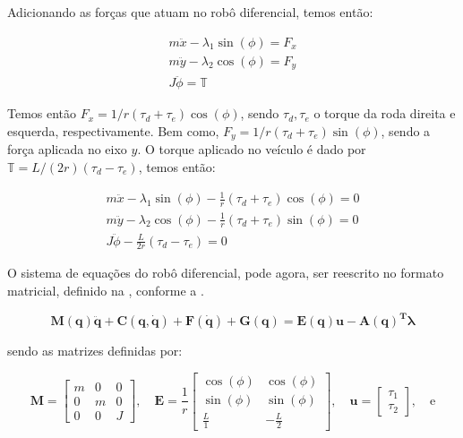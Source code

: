 Adicionando as forças que atuam no robô diferencial, temos então:

\begin{equation}
    \begin{split}
        m\ddot{x} - \lambda_1 \sin(\phi) = F_x \\
        m\ddot{y} - \lambda_2 \cos(\phi) = F_y \\
        J\ddot{\phi} = \mathbb{T}
    \end{split}
\end{equation}

Temos então $F_x = 1/r\left( \tau_{d}+ \tau_{e}\right)\cos(\phi)$, sendo $\tau_d, \tau_e$ o torque da roda direita e esquerda, respectivamente.
Bem como, $F_y = 1/r\left( \tau_{d}+ \tau_{e}\right)\sin(\phi)$, sendo a força aplicada no eixo $y$. O torque aplicado no veículo é dado por $\mathbb{T}= L/(2r)\left( \tau_d - \tau_e \right)$,
temos então:

\begin{equation}
    \begin{split}
        m\ddot{x} - \lambda_1 \sin(\phi) - \frac{1}{r}\left( \tau_d + \tau_e \right) \cos(\phi)= 0 \\
        m\ddot{y} - \lambda_2 \cos(\phi) - \frac{1}{r}\left( \tau_d + \tau_e \right) \sin(\phi)= 0 \\
        J\ddot{\phi} - \frac{L}{2r}\left( \tau_d - \tau_e \right)= 0
    \end{split}
\end{equation}

O sistema de equações do robô diferencial, pode agora, ser reescrito no formato matricial, definido na , conforme a .

\begin{equation}
    \mathbf{M(q)\ddot{q}}+ \mathbf{C(q, \dot{q})}+ \mathbf{F(\dot{q})}+ \mathbf{G(q)} = \mathbf{E(q)u}
    - \mathbf{A(q)^T}\boldsymbol{\lambda}
    \label{eq:rmrestri2}
\end{equation}

\noindent sendo as matrizes definidas por:

\begin{equation*}
    \mathbf{M} = 
    \begin{bmatrix}
        m & 0 & 0 \\
        0 & m & 0 \\
        0 & 0 & J
    \end{bmatrix}, \quad
    \mathbf{E} = \frac{1}{r}
    \begin{bmatrix}
        \cos(\phi) & \cos(\phi) \\
        \sin(\phi) & \sin(\phi) \\
        \frac{L}{1} & -\frac{L}{2}
    \end{bmatrix}, \quad 
    \mathbf{u} = 
    \begin{bmatrix}
        \tau_1 \\
        \tau_2
    \end{bmatrix}, \quad \text{e}
\end{equation*}

